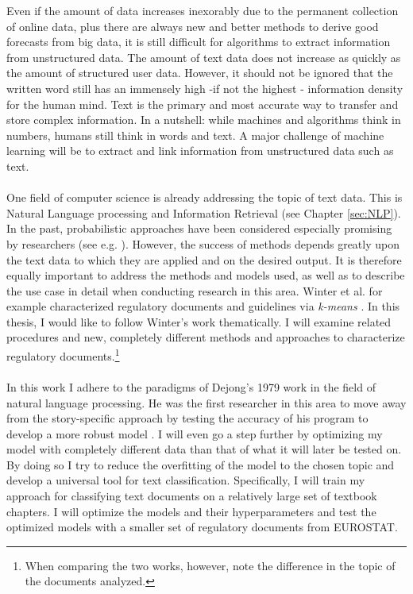 \documentclass[11pt,a4paper]{article}
\begin{document}
Even if the amount of data increases inexorably due to the permanent collection of online data, plus there are always new and better methods to derive good forecasts from big data, it is still difficult for algorithms to extract information from unstructured data. The amount of text data does not increase as quickly as the amount of structured user data. However, it should not be ignored that the written word still has an immensely high -if not the highest - information density for the human mind. Text is the primary and most accurate way to transfer and store complex information. In a nutshell: while machines and algorithms think in numbers, humans still think in words and text. A major challenge of machine learning will be to extract and link information from unstructured data such as text.\\
\ \\
One field of computer science is already addressing the topic of text data. This is Natural Language processing and Information Retrieval (see Chapter \ref{sec:NLP}). In the past, probabilistic approaches have been considered especially promising by researchers (see e.g. \cite{Manning1999}). However, the success of methods depends greatly upon the text data to which they are applied and on the desired output. It is therefore equally important to address the methods and models used, as well as to describe the use case in detail when conducting research in this area. Winter et al. for example characterized regulatory documents and guidelines via \textit{k-means} \cite{Winter2017}. In this thesis, I would like to follow Winter's work thematically. I will examine related procedures and new, completely different methods and approaches to characterize regulatory documents.\footnote{When comparing the two works, however, note the difference in the topic of the documents analyzed.}\\
\ \\
In this work I adhere to the paradigms of Dejong's 1979 work in the field of natural language processing. He was the first researcher in this area to move away from the story-specific approach by testing the accuracy of his program to develop a more robust model \cite{DeJong1979}. I will even go a step further by optimizing my model with completely different data than that of what it will later be tested on. By doing so I try to reduce the overfitting of the model to the chosen topic and develop a universal tool for text classification. Specifically, I will train my approach for classifying text documents on a relatively large set of textbook chapters. I will optimize the models and their hyperparameters and test the optimized models with a smaller set of regulatory documents from EUROSTAT.\\
\end{document}
